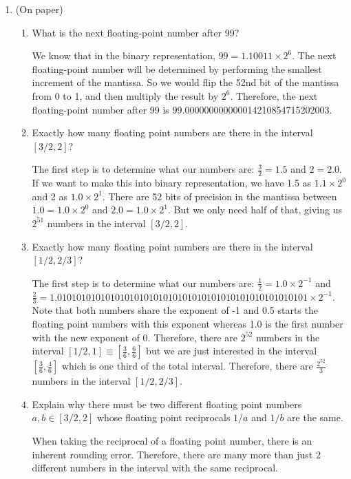 \documentclass[12pt]{article}
\begin{document}
\begin{enumerate}

    \item (On paper)
    \begin{enumerate}
        \item What is the next floating-point number after 99? 
        
        We know that in the binary representation, \(99=1.10011 \times 2^6\). The next floating-point number will be determined by performing the smallest increment of the mantissa. So we would flip the 52nd bit of the mantissa from 0 to 1, and then multiply the result by \(2^6\). Therefore, the next floating-point number after 99 is 99.000000000000014210854715202003.
        
        \item Exactly how many floating point numbers are there in the interval \([3/2, 2]\)? 
        
        The first step is to determine what our numbers are: \(\frac{3}{2}=1.5\) and \(2=2.0\). If we want to make this into binary representation, we have 1.5 as \(1.1 \times 2^0\) and 2 as \(1.0 \times 2^1\). There are 52 bits of precision in the mantissa between \(1.0=1.0 \times 2^0\) and \(2.0=1.0 \times 2^1\). But we only need half of that, giving us \(2^{51}\) numbers in the interval \([3/2, 2]\).
        
        \item Exactly how many floating point numbers are there in the interval \([1/2, 2/3]\)? 
        
        The first step is to determine what our numbers are: \(\frac{1}{2}=1.0 \times 2^{-1}\) and \(\frac{2}{3}=1.0101010101010101010101010101010101010101010101010101 \times 2^{-1}\). Note that both numbers share the exponent of -1 and 0.5 starts the floating point numbers with this exponent whereas 1.0 is the first number with the new exponent of 0. Therefore, there are \(2^{52}\) numbers in the interval \([1/2, 1] \equiv [\frac{3}{6}, \frac{6}{6}]\) but we are just interested in the interval \([\frac{3}{6}, \frac{4}{6}]\) which is one third of the total interval. Therefore, there are \(\frac{2^{52}}{3}\) numbers in the interval \([1/2, 2/3]\). 
        
        \item Explain why there must be two different floating point numbers \(a, b \in [3/2, 2]\) whose floating point reciprocals \(1/a\) and \(1/b\) are the same.
        
        When taking the reciprocal of a floating point number, there is an inherent rounding error. Therefore, there are many more than just 2 different numbers in the interval with the same reciprocal.
        

\end{enumerate}
\end{enumerate}
\end{document}
